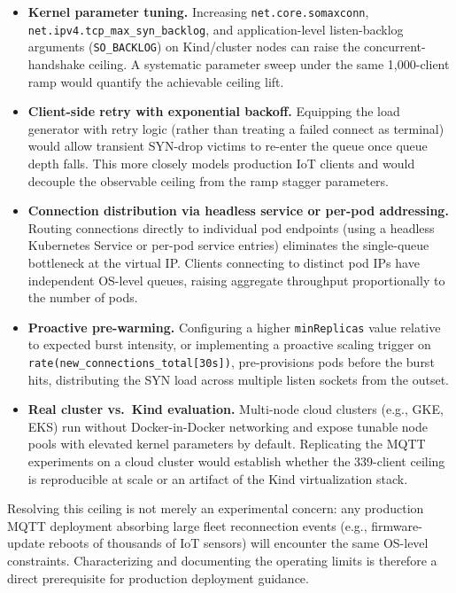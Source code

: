 \documentclass[twocolumn]{svjour3}
\begin{document}
\begin{itemize}[leftmargin=*]
  \item \textbf{Kernel parameter tuning.} Increasing \texttt{net.core.somaxconn}, \texttt{net.ipv4.tcp\_max\_syn\_backlog}, and application-level listen-backlog arguments (\texttt{SO\_BACKLOG}) on Kind/cluster nodes can raise the concurrent-handshake ceiling. A systematic parameter sweep under the same 1,000-client ramp would quantify the achievable ceiling lift.

  \item \textbf{Client-side retry with exponential backoff.} Equipping the load generator with retry logic (rather than treating a failed connect as terminal) would allow transient SYN-drop victims to re-enter the queue once queue depth falls. This more closely models production IoT clients and would decouple the observable ceiling from the ramp stagger parameters.

  \item \textbf{Connection distribution via headless service or per-pod addressing.} Routing connections directly to individual pod endpoints (using a headless Kubernetes Service or per-pod service entries) eliminates the single-queue bottleneck at the virtual IP. Clients connecting to distinct pod IPs have independent OS-level queues, raising aggregate throughput proportionally to the number of pods.

  \item \textbf{Proactive pre-warming.} Configuring a higher \texttt{minReplicas} value relative to expected burst intensity, or implementing a proactive scaling trigger on \texttt{rate(new\_connections\_total[30s])}, pre-provisions pods before the burst hits, distributing the SYN load across multiple listen sockets from the outset.

  \item \textbf{Real cluster vs.\ Kind evaluation.} Multi-node cloud clusters (e.g., GKE, EKS) run without Docker-in-Docker networking and expose tunable node pools with elevated kernel parameters by default. Replicating the MQTT experiments on a cloud cluster would establish whether the 339-client ceiling is reproducible at scale or an artifact of the Kind virtualization stack.
\end{itemize}

Resolving this ceiling is not merely an experimental concern: any production MQTT deployment absorbing large fleet reconnection events (e.g., firmware-update reboots of thousands of IoT sensors) will encounter the same OS-level constraints. Characterizing and documenting the operating limits is therefore a direct prerequisite for production deployment guidance.
\end{document}
